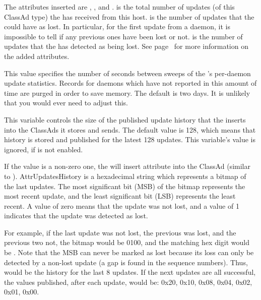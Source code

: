 \begin{description}
  The attributes inserted are , ,
  and .   is the total number of
  updates (of this ClassAd type) the  has received 
  from this host.
   is the number of updates that the 
  could have as lost.  In particular, for the first update from a
  daemon, it is impossible to tell if any previous ones have been lost or not.
   is the number of updates that the 
  has detected as being lost.
  See page~\pageref{sec:Collector-Added-Attributes} for more information on the
  added attributes.

\label{param:CollectorStatsSweep}
\item[\Macro{COLLECTOR\_STATS\_SWEEP}]
  This value specifies the number of
  seconds between sweeps of the 's per-daemon update
  statistics.  Records for daemons which have not reported in this amount
  of time are purged in order to save memory.  The default is two days.
  It is unlikely that you would ever need to adjust this.

\label{param:CollectorDaemonHistorySize}
\item[\Macro{COLLECTOR\_DAEMON\_HISTORY\_SIZE}]
  This variable controls the
  size of the published update history that the  inserts into
  the ClassAds it stores and sends.  The default value is 128, which
  means that history is stored and published for the latest 128
  updates.  This variable's value is ignored,
  if  is not enabled.

  If the value is a non-zero one, the  will insert
  attribute
   into the ClassAd (similar to ).
  Attr{UpdatesHistory} is a hexadecimal string which represents
  a bitmap of the last  updates.
  The most significant bit (MSB) of the bitmap represents the
  most recent update, and the least significant bit (LSB) represents
  the least recent.  A value of zero means that the update was not lost,
  and a value of 1 indicates that the update was detected as lost.

  For example, if the last update was not lost, the previous was lost, and
  the previous two not, the bitmap would be 0100, and the matching hex
  digit would be .  Note that the MSB can never be marked as lost
  because its loss can only be detected by a non-lost update 
  (a gap is found in the sequence numbers).  
  Thus,  
  would be the history for the last 8 updates.  
  If the next updates are all successful, the values published,
  after each update,
  would be: 0x20, 0x10, 0x08, 0x04, 0x02, 0x01, 0x00.


\end{description}
